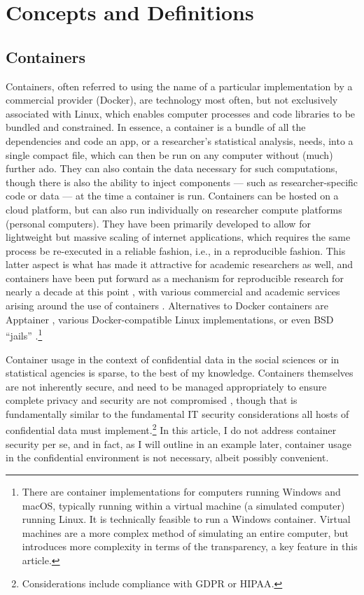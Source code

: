 \documentclass[inline]{hdsr}
\begin{document}
\section{Concepts and Definitions}

\subsection{Containers}

Containers, often referred to using the name of a particular implementation by a commercial provider (Docker), are technology most often, but not exclusively associated with Linux, which enables computer processes and code libraries to be bundled and constrained. In essence, a container is a bundle of all the dependencies and code an app, or a researcher's statistical analysis, needs, into a single compact file, which can then be run on any computer without (much) further ado. They can also contain the data necessary for such computations, though there is also the ability to inject components --- such as researcher-specific code or data --- at the time a container is run. Containers can be hosted on a cloud platform, but can also run individually on researcher compute platforms (personal computers).  They have been primarily developed to allow for lightweight but massive scaling of internet applications, which requires the same process be re-executed in a reliable fashion, i.e., in a reproducible fashion. This latter aspect is what has made it attractive for academic researchers as well, and containers have been put forward as a mechanism for reproducible research for nearly a decade at this point \citep{boettiger_introduction_2015}, with various commercial and academic services arising around the use of containers \citep{clyburne-sherin_computational_2019,chard_toward_2020,brinckman_computing_2018}. Alternatives to Docker containers are Apptainer \citep{contributors_to_the_apptainer_project_apptainer_2025}, various Docker-compatible Linux implementations, or even BSD ``jails'' \citep{the_freebsd_project_chapter_2025}.\footnote{There are container implementations for computers running Windows and macOS, typically running within a virtual machine (a simulated computer) running Linux. It is technically feasible to run a Windows container. Virtual machines are a more complex method of simulating an entire computer, but introduces more complexity in terms of the transparency, a key feature in this article.} 

Container usage in the context of confidential data in the social sciences or in statistical agencies is sparse, to the best of my knowledge. Containers themselves are not inherently secure, and need to be managed appropriately to ensure complete privacy and security are not compromised \citep[see][]{souppaya_application_2017}, though that is fundamentally similar to the fundamental IT security considerations all hosts of confidential data must implement.\footnote{Considerations include compliance with \ac{GDPR} or \ac{HIPAA}.} In this article, I do not address container security per se, and in fact, as I will outline in an example later, container usage in the confidential environment is not necessary, albeit possibly convenient.  
\end{document}
